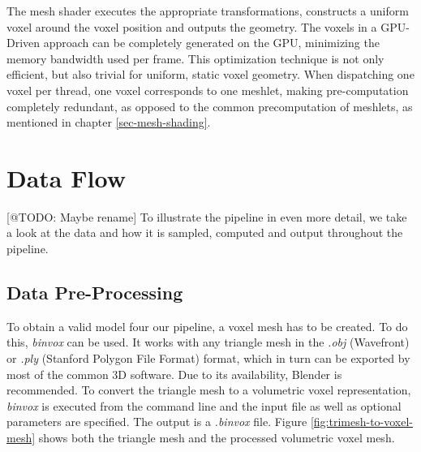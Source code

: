 The mesh shader executes the appropriate transformations, constructs a uniform voxel around the voxel position 
and outputs the geometry. The voxels in a \ac{GPU}-Driven approach can be completely generated on the \ac{GPU}, 
minimizing the memory bandwidth used per frame. This optimization technique is not only efficient, but also 
trivial for uniform, static voxel geometry. When dispatching one voxel per thread, one voxel corresponds 
to one meshlet, making pre-computation completely redundant, as opposed to the common precomputation of meshlets, 
as mentioned in chapter \ref{sec-mesh-shading}. 


\section{Data Flow} \label{sec-data-flow}

[@TODO: Maybe rename]
To illustrate the pipeline in even more detail, we take a look at the data and how it is sampled, computed 
and output throughout the pipeline. 

\subsection*{Data Pre-Processing}

To obtain a valid model four our pipeline, a voxel mesh has to be created. To do this, \emph{binvox} 
\cite{binvox} can be used. It works with any triangle mesh in the \emph{.obj} (Wavefront) or \emph{.ply} 
(Stanford Polygon File Format) format, which in turn can be exported by most of the common 3D software. 
Due to its availability, Blender \cite{Blender} is recommended. To convert the triangle mesh to a volumetric 
voxel representation, \emph{binvox} is executed from the command line and the input file as well as optional 
parameters are specified. The output is a \emph{.binvox} file. Figure \ref{fig:trimesh-to-voxel-mesh} shows 
both the triangle mesh and the processed volumetric voxel mesh. 

